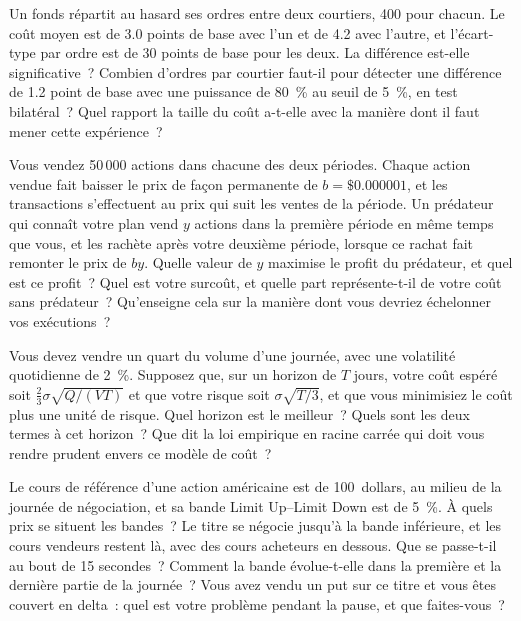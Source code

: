 \begin{question}\label{iq:iv2:markets-and-microstructure:44}
Un fonds répartit au hasard ses ordres entre deux courtiers, 400 pour chacun. Le coût moyen est de 3.0 points de base avec l'un et de 4.2 avec l'autre, et l'écart-type par ordre est de 30 points de base pour les deux. La différence est-elle significative~? Combien d'ordres par courtier faut-il pour détecter une différence de 1.2 point de base avec une puissance de 80~\% au seuil de 5~\%, en test bilatéral~? Quel rapport la taille du coût a-t-elle avec la manière dont il faut mener cette expérience~?
\end{question}

\begin{question}\label{iq:iv2:markets-and-microstructure:45}
Vous vendez 50\,000 actions dans chacune des deux périodes. Chaque action vendue fait baisser le prix de façon permanente de $b = \$0.000001$, et les transactions s'effectuent au prix qui suit les ventes de la période. Un prédateur qui connaît votre plan vend $y$ actions dans la première période en même temps que vous, et les rachète après votre deuxième période, lorsque ce rachat fait remonter le prix de $by$. Quelle valeur de $y$ maximise le profit du prédateur, et quel est ce profit~? Quel est votre surcoût, et quelle part représente-t-il de votre coût sans prédateur~? Qu'enseigne cela sur la manière dont vous devriez échelonner vos exécutions~?
\end{question}

\begin{question}\label{iq:iv2:markets-and-microstructure:46}
Vous devez vendre un quart du volume d'une journée, avec une volatilité quotidienne de 2~\%. Supposez que, sur un horizon de $T$ jours, votre coût espéré soit $\tfrac23\sigma\sqrt{Q/(VT)}$ et que votre risque soit $\sigma\sqrt{T/3}$, et que vous minimisiez le coût plus une unité de risque. Quel horizon est le meilleur~? Quels sont les deux termes à cet horizon~? Que dit la loi empirique en racine carrée qui doit vous rendre prudent envers ce modèle de coût~?
\end{question}

\begin{question}\label{iq:iv2:markets-and-microstructure:47}
Le cours de référence d'une action américaine est de 100~dollars, au milieu de la journée de négociation, et sa bande Limit Up--Limit Down est de 5~\%. À quels prix se situent les bandes~? Le titre se négocie jusqu'à la bande inférieure, et les cours vendeurs restent là, avec des cours acheteurs en dessous. Que se passe-t-il au bout de 15 secondes~? Comment la bande évolue-t-elle dans la première et la dernière partie de la journée~? Vous avez vendu un put sur ce titre et vous êtes couvert en delta~: quel est votre problème pendant la pause, et que faites-vous~?
\end{question}

